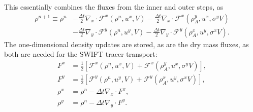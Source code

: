 \documentclass{ametsocV6.1}
\begin{document}
This essentially combines the fluxes from the inner and outer steps, as
\begin{equation} \label{eqn:swift_density_2}
\begin{split}
\rho^{n+1} \equiv \rho^n & - \frac{\Delta t}{2} \nabla_x\cdot \mathcal{F}^x(\rho^n, u^x, V) - \frac{\Delta{t}}{2} \nabla_x\cdot \mathcal{F}^x(\rho^y_A, u^x, \sigma^yV) \\
& - \frac{\Delta{t}}{2} \nabla_y\cdot \mathcal{F}^y(\rho^n, u^y,V) - \frac{\Delta{t}}{2} \nabla_y\cdot \mathcal{F}^y(\rho^x_A, u^y, \sigma^xV).
\end{split}
\end{equation}
The one-dimensional density updates are stored, as are the dry mass fluxes, as both are needed for the SWIFT tracer transport:
\begin{subequations}
\begin{align}
F^x &= \frac{1}{2}\left[ \mathcal{F}^x(\rho^n, u^x,V) +  \mathcal{F}^x(\rho^y_A, u^x, \sigma^yV)\right], \\ 
F^y &= \frac{1}{2}\left[ \mathcal{F}^y(\rho^n, u^y,V) +  \mathcal{F}^y(\rho^x_A, u^y, \sigma^xV)\right], \\
\rho^x &= \rho^{n} - \Delta{t} \nabla_x\cdot F^x, \\
\rho^y &= \rho^{n} - \Delta{t} \nabla_y\cdot F^y. 
\end{align}
\end{subequations}
\end{document}
